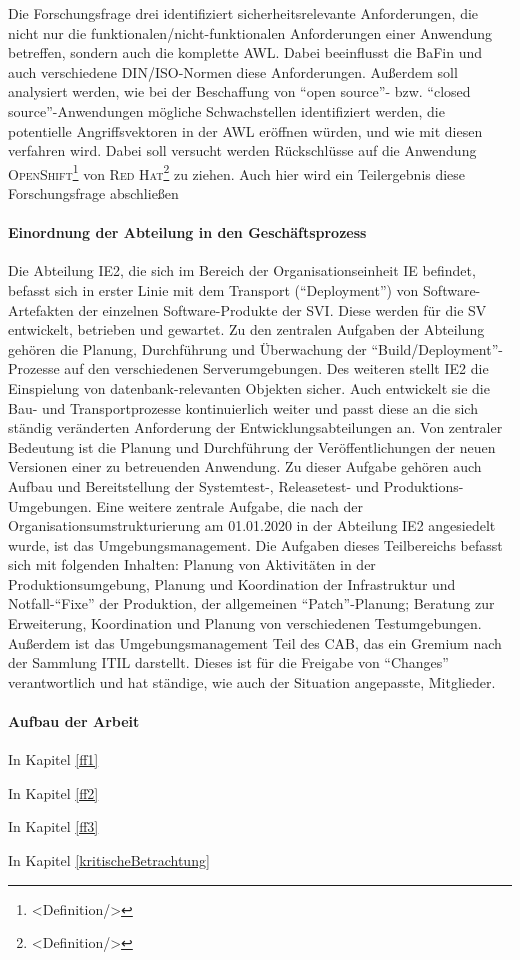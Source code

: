 Die Forschungsfrage drei identifiziert sicherheitsrelevante Anforderungen, die nicht nur die funktionalen/nicht-funktionalen Anforderungen einer Anwendung betreffen, sondern auch die komplette \ac{AWL}. Dabei beeinflusst die \ac{BaFin} und auch verschiedene \textsc{DIN/ISO}-Normen diese Anforderungen. Außerdem soll analysiert werden, wie bei der Beschaffung von \enquote{open source}- bzw. \enquote{closed source}-Anwendungen mögliche Schwachstellen identifiziert werden, die potentielle Angriffsvektoren in der \ac{AWL} eröffnen würden, und wie mit diesen verfahren wird. Dabei soll versucht werden Rückschlüsse auf die Anwendung \textsc{OpenShift\footnote{<Definition/>}} von \textsc{Red Hat\footnote{<Definition/>}} zu ziehen. Auch hier wird ein Teilergebnis diese Forschungsfrage abschließen


\paragraph{Einordnung der Abteilung in den Geschäftsprozess}
Die Abteilung \ac{IE2}, die sich im Bereich der Organisationseinheit \ac{IE} befindet, befasst sich in erster Linie mit dem Transport (\enquote{Deployment}) von Software-Artefakten der einzelnen Software-Produkte der \ac{SVI}. Diese werden für die \ac{SV} entwickelt, betrieben und gewartet. Zu den zentralen Aufgaben der Abteilung gehören die Planung, Durchführung und Überwachung der \enquote{Build/Deployment}-Prozesse auf den verschiedenen Serverumgebungen. Des weiteren stellt \ac{IE2} die Einspielung von datenbank-relevanten Objekten sicher. Auch entwickelt sie die Bau- und Transportprozesse kontinuierlich weiter und passt diese an die sich ständig veränderten Anforderung der Entwicklungsabteilungen an. Von zentraler Bedeutung ist die Planung und Durchführung der Veröffentlichungen der neuen Versionen einer zu betreuenden Anwendung. Zu dieser Aufgabe gehören auch Aufbau und Bereitstellung der Systemtest-, Releasetest- und Produktions-Umgebungen. Eine weitere zentrale Aufgabe, die nach der Organisationsumstrukturierung am 01.01.2020 in der Abteilung \ac{IE2} angesiedelt wurde, ist das Umgebungsmanagement. Die Aufgaben dieses Teilbereichs befasst sich mit folgenden Inhalten: Planung von Aktivitäten in der Produktionsumgebung, Planung und Koordination der Infrastruktur und Notfall-\enquote{Fixe} der Produktion, der allgemeinen \enquote{Patch}-Planung; Beratung zur Erweiterung, Koordination und Planung von verschiedenen Testumgebungen. Außerdem ist das Umgebungsmanagement Teil des \ac{CAB}, das ein Gremium nach der Sammlung \ac{ITIL} darstellt. Dieses ist für die Freigabe von \enquote{Changes} verantwortlich und hat ständige, wie auch der Situation angepasste, Mitglieder. 

\paragraph{Aufbau der Arbeit}
In Kapitel \vref{ff1} \par
In Kapitel \vref{ff2} \par
In Kapitel \vref{ff3} \par
In Kapitel \vref{kritischeBetrachtung}
